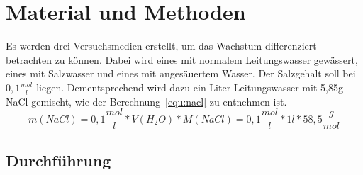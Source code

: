 \section{Material und Methoden} %
\label{sec:material_und_methoden}
    Es werden drei Versuchsmedien erstellt, um das Wachstum differenziert betrachten zu können. Dabei wird eines mit normalem Leitungswasser gewässert, eines mit Salzwasser und eines mit angesäuertem Wasser. Der Salzgehalt soll bei $0,1 \frac{mol}{l}$ liegen. Dementsprechend wird dazu ein Liter Leitungswasser mit 5,85g NaCl gemischt, wie der Berechnung~\ref{equ:nacl} zu entnehmen ist.
    \begin{equation}\label{equ:nacl}
        m(NaCl) = 0,1\frac{mol}{l} * V(H_2O) * M(NaCl)
        = 0,1\frac{mol}{l} * 1l * 58,5\frac{g}{mol}
            
    \end{equation}
    \subsection{Durchführung} %
    \label{sub:durchführung}
    
